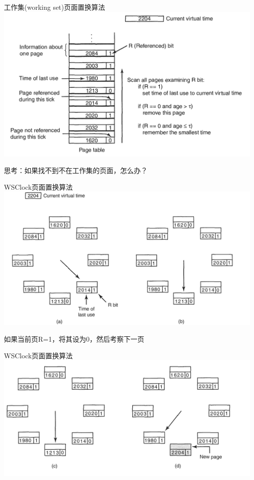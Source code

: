 \documentclass[xcolor=svgnames]{beamer}
\begin{document}
\begin{CJK*}{UTF8}{gbsn}
\begin{frame}{工作集(working set)页面置换算法}
\includegraphics[width=1.0\textwidth]{ws.png}

思考：如果找不到不在工作集的页面，怎么办？
\end{frame}

\begin{frame}{WSClock页面置换算法}
\includegraphics[width=1.0\textwidth]{wsclock1.png}

如果当前页R=1，将其设为0，然后考察下一页
\end{frame}

\begin{frame}{WSClock页面置换算法}
\includegraphics[width=1.0\textwidth]{wsclock2.png}


\end{frame}
\end{CJK*}
\end{document}
